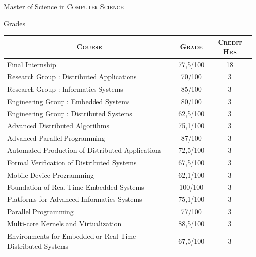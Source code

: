 
\par{\centering\Large \hypertarget{grds_ms}{Master of Science in \textsc{Computer Science}}\par}
\large{\centering Grades\par}\normalsize

\begin{center}
\begin{tabular}{lcc}
\multicolumn{1}{c}{\textsc{Course}} & \textsc{Grade}&\textsc{Credit Hrs}\\
\hline
Final Internship                                           &       77,5/100 & 18    \\
Research Group : Distributed Applications                  &       70/100 & 3     \\
Research Group : Informatics Systems                       &       85/100 & 3     \\
Engineering Group : Embedded Systems                       &   80/100 & 3     \\
Engineering Group : Distributed Systems                    &     62,5/100   & 3     \\
\hline
Advanced Distributed Algorithms                            &  75,1/100 & 3     \\
Advanced Parallel Programming                              &    87/100 & 3     \\
Automated Production of Distributed Applications           &  72,5/100 & 3     \\
Formal Verification of Distributed Systems                 &  67,5/100 & 3     \\
Mobile Device Programming                                  &  62,1/100 & 3     \\
Foundation of Real-Time Embedded Systems                   &   100/100 & 3     \\
Platforms for Advanced Informatics Systems                 &  75,1/100 & 3     \\
Parallel Programming                                       &    77/100 & 3     \\
Multi-core Kernels and Virtualization                      &  88,5/100 & 3     \\
Environments for Embedded or Real-Time Distributed Systems &  67,5/100 & 3     \\

\end{tabular}
\end{center}
